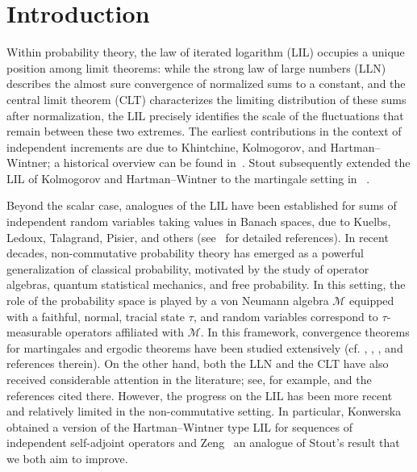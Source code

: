 \documentclass[10pt]{amsart}
\theoremstyle{definition}
\theoremstyle{myremark}
\numberwithin{equation}{section}
\begin{document}
\maketitle
\section{Introduction}

Within probability theory, the law of iterated logarithm (LIL) occupies a unique position among limit theorems: while the strong law of large numbers (LLN) describes the almost sure convergence of normalized sums to a constant, and the central limit theorem (CLT) characterizes the limiting distribution of these sums after normalization, the LIL precisely identifies the scale of the fluctuations that remain between these two extremes. The earliest contributions in the context of independent increments are due to Khintchine, Kolmogorov, and Hartman--Wintner; a historical overview can be found in~\cite{Bauer96Prob}. Stout subsequently extended the LIL of Kolmogorov and Hartman--Wintner to the martingale setting in ~\cite{stout1970martingale,stout1970hartman}.  

Beyond the scalar case, analogues of the LIL have been established for sums of independent random variables taking values in Banach spaces, due to Kuelbs, Ledoux, Talagrand, Pisier, and others (see~\cite{ledoux1991probability} for detailed references).
In recent decades, non-commutative probability theory has emerged as a powerful generalization of classical probability, motivated by the study of operator algebras, quantum statistical mechanics, and free probability. In this setting, the role of the probability space is played by a von Neumann algebra $\mathcal{M}$ equipped with a faithful, normal, tracial state $\tau$, and random variables correspond to $\tau$-measurable operators affiliated with $\mathcal{M}$. In this framework, convergence theorems for martingales and ergodic theorems have been studied extensively (cf. \cite{cuculescu1971martingales},  \cite{junge2002doob}, \cite{lance1976ergodic}, \cite{JX07} and references therein). On the other hand, both the LLN and the CLT have also received considerable attention in the literature; see, for example, \cite{batty1979strong, Luc, Quang, Voi} and the references cited there. However, the progress on the LIL has been more recent and relatively limited in the non-commutative setting. In particular, Konwerska~\cite{konwerska2008law} obtained a version of the Hartman--Wintner type LIL for sequences of independent self-adjoint operators and Zeng~\cite{zeng2015kolmogorov} an analogue of Stout's result that we both aim to improve. 
\end{document}
